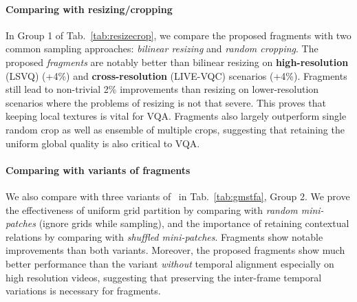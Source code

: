\documentclass[runningheads]{llncs}
\begin{document}
\paragraph{Comparing with resizing/cropping} In Group 1 of Tab.~\ref{tab:resizecrop}, we compare the proposed fragments with two common sampling approaches: \textit{bilinear resizing} and \textit{random cropping}. The proposed \textit{fragments} are notably better than bilinear resizing on \textbf{high-resolution} (LSVQ) (+4\%) and \textbf{cross-resolution} (LIVE-VQC) scenarios (+4\%). Fragments still lead to non-trivial 2\% improvements than resizing on lower-resolution scenarios where the problems of resizing is not that severe. This proves that keeping local textures is vital for VQA. Fragments also largely outperform single random crop as well as ensemble of multiple crops, suggesting that retaining the uniform global quality is also critical to VQA.

\paragraph{Comparing with variants of fragments} We also compare with three variants of \frag~in Tab.~\ref{tab:gmstfa}, Group 2. We prove the effectiveness of uniform grid partition by comparing with \textit{random mini-patches} (ignore grids while sampling), and the importance of retaining contextual relations by comparing with \textit{shuffled mini-patches}. Fragments show notable improvements than both variants. Moreover, the proposed fragments show much better performance than the variant \textit{without} temporal alignment especially on high resolution videos, suggesting that preserving the inter-frame temporal variations is necessary for fragments. 
\end{document}
